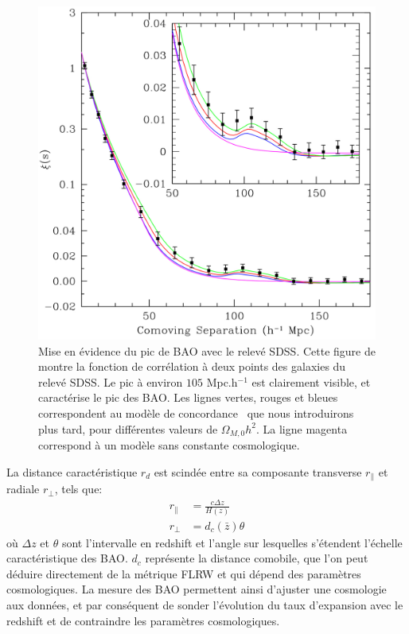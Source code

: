 \documentclass[../main/main.tex]{subfiles}
\begin{document}
\begin{figure}[ht]
  
  \begin{minipage}[c]{0.42\textwidth}
    \caption[Mise en évidence du pic de BAO avec le relevé SDSS.]{Mise en
      évidence du pic de BAO avec le relevé SDSS. Cette figure de
      \citet{Eisenstein} montre la fonction de corrélation à deux points
      des galaxies du relevé SDSS. Le pic à environ $105$ Mpc.h$^{-1}$ est
      clairement visible, et caractérise le pic des BAO. Les lignes vertes,
      rouges et bleues correspondent au modèle de concordance \lcdm\, que
      nous introduirons plus tard, pour différentes valeurs de
      $\Omega_{M,0}h^{2}$. La ligne magenta correspond à un modèle sans
      constante cosmologique.}\label{fig:baopeak}
    \end{minipage}
    \begin{minipage}[c]{0.55\textwidth}
      \includegraphics[width=\textwidth]{../figures/01_cosmology/BAOpeak.pdf}
    \end{minipage}\hfill
  
\end{figure}

La distance caractéristique $r_{d}$ est scindée
entre sa composante transverse $r_{\parallel}$ et radiale $r_{\perp}$,
tels que:
\begin{align}
  \label{eq:bao}
  r_{\parallel}&=\frac{c\Delta z}{H(z)}\\
  r_{\perp}&=d_{c}(\bar{z})\theta
\end{align}
où $\Delta z$ et $\theta$ sont l'intervalle en redshift et
l'angle sur lesquelles s'étendent l'échelle caractéristique des
BAO. $d_{c}$ représente la distance comobile, que l'on peut déduire
directement de la métrique FLRW et qui dépend des paramètres
cosmologiques. La mesure des BAO permettent ainsi d'ajuster une
cosmologie aux données, et par conséquent de sonder l'évolution du taux
d'expansion avec le redshift et de
contraindre les paramètres cosmologiques.
\end{document}
